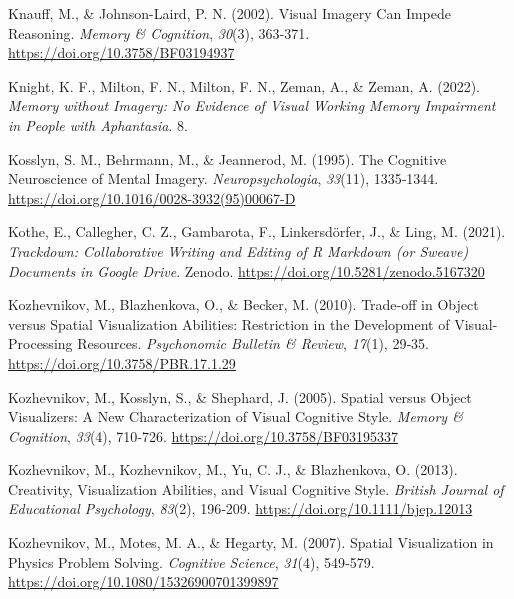 \documentclass[
  12pt,
]{article}
\newlength{\cslhangindent}
\newlength{\cslentryspacingunit} %
\newenvironment{CSLReferences}[2] %
 {%
  \setlength{\parindent}{0pt}
  \ifodd #1
  \let\oldpar\par
  \def\par{\hangindent=\cslhangindent\oldpar}
  \fi
  \setlength{\parskip}{#2\cslentryspacingunit}
 }%
 {}
\begin{document}
\begin{CSLReferences}{1}{0}
\leavevmode{}%
Knauff, M., \& Johnson-Laird, P. N. (2002). Visual Imagery Can Impede
Reasoning. \emph{Memory \& Cognition}, \emph{30}(3), 363‑371.
\url{https://doi.org/10.3758/BF03194937}

\leavevmode{}%
Knight, K. F., Milton, F. N., Milton, F. N., Zeman, A., \& Zeman, A.
(2022). \emph{Memory without {Imagery}: {No Evidence} of {Visual Working
Memory Impairment} in {People} with {Aphantasia}}. 8.

\leavevmode{}%
Kosslyn, S. M., Behrmann, M., \& Jeannerod, M. (1995). The Cognitive
Neuroscience of Mental Imagery. \emph{Neuropsychologia}, \emph{33}(11),
1335‑1344. \url{https://doi.org/10.1016/0028-3932(95)00067-D}

\leavevmode{}%
Kothe, E., Callegher, C. Z., Gambarota, F., Linkersdörfer, J., \& Ling,
M. (2021). \emph{Trackdown: {Collaborative Writing} and {Editing} of {R
Markdown} (or {Sweave}) {Documents} in {Google Drive}}. {Zenodo}.
\url{https://doi.org/10.5281/zenodo.5167320}

\leavevmode{}%
Kozhevnikov, M., Blazhenkova, O., \& Becker, M. (2010). Trade-off in
Object versus Spatial Visualization Abilities: {Restriction} in the
Development of Visual-Processing Resources. \emph{Psychonomic Bulletin
\& Review}, \emph{17}(1), 29‑35.
\url{https://doi.org/10.3758/PBR.17.1.29}

\leavevmode{}%
Kozhevnikov, M., Kosslyn, S., \& Shephard, J. (2005). Spatial versus
Object Visualizers: {A} New Characterization of Visual Cognitive Style.
\emph{Memory \& Cognition}, \emph{33}(4), 710‑726.
\url{https://doi.org/10.3758/BF03195337}

\leavevmode{}%
Kozhevnikov, M., Kozhevnikov, M., Yu, C. J., \& Blazhenkova, O. (2013).
Creativity, Visualization Abilities, and Visual Cognitive Style.
\emph{British Journal of Educational Psychology}, \emph{83}(2), 196‑209.
\url{https://doi.org/10.1111/bjep.12013}

\leavevmode{}%
Kozhevnikov, M., Motes, M. A., \& Hegarty, M. (2007). Spatial
{Visualization} in {Physics Problem Solving}. \emph{Cognitive Science},
\emph{31}(4), 549‑579. \url{https://doi.org/10.1080/15326900701399897}


\end{CSLReferences}
\end{document}
